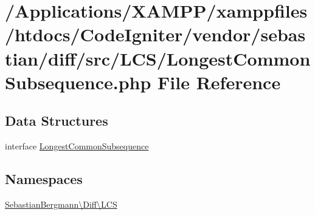\hypertarget{_longest_common_subsequence_8php}{}\section{/\+Applications/\+X\+A\+M\+P\+P/xamppfiles/htdocs/\+Code\+Igniter/vendor/sebastian/diff/src/\+L\+C\+S/\+Longest\+Common\+Subsequence.php File Reference}
\label{_longest_common_subsequence_8php}
\subsection*{Data Structures}
\begin{DoxyCompactItemize}
\item 
interface \mbox{\hyperlink{interface_sebastian_bergmann_1_1_diff_1_1_l_c_s_1_1_longest_common_subsequence}{Longest\+Common\+Subsequence}}
\end{DoxyCompactItemize}
\subsection*{Namespaces}
\begin{DoxyCompactItemize}
\item 
 \mbox{\hyperlink{namespace_sebastian_bergmann_1_1_diff_1_1_l_c_s}{Sebastian\+Bergmann\textbackslash{}\+Diff\textbackslash{}\+L\+CS}}
\end{DoxyCompactItemize}
